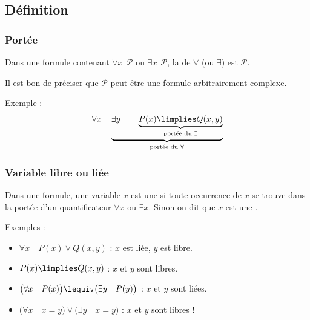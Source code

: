 \documentclass[11pt,class=report,crop=false]{standalone}
\begin{document}
\subsection{Définition}

\subsubsection{Portée}

\begin{definition}
Dans une formule contenant \og{}$\forall x \ \ \mathcal{P}$\fg{} ou \og{}$\exists x \ \ \mathcal{P}$\fg{}, la  de $\forall$ (ou $\exists$) est $\mathcal{P}$.
\end{definition}

Il est bon de préciser que $\mathcal{P}$ peut être une formule arbitrairement complexe.

Exemple :
\[
\forall x \quad \underbrace{\exists y \qquad \underbrace{P(x) \limplies Q(x,y)}_{\text{portée du $\exists$}}}_{\text{portée du $\forall$}}
\]


\subsubsection{Variable libre ou liée}

\begin{definition}
Dans une formule, une variable $x$ est une 	 si toute occurrence de $x$ se trouve dans la portée d'un quantificateur $\forall x$ ou $\exists x$.
Sinon on dit que $x$ est une .
\end{definition}

Exemples :
\begin{itemize}
	\item $\forall x \quad P(x) \lor Q(x,y)$ : $x$ est liée, $y$ est libre.
	
	\item $P(x) \limplies Q(x,y)$ : $x$ et $y$ sont libres.
	
	\item $\big(\forall x  \quad P(x)\big) \lequiv \big(\exists y \quad P(y)\big)$ : $x$ et $y$ sont liées.
	
	\item $\big(\forall x  \quad x=y\big) \lor \big(\exists y \quad x=y\big)$ : $x$ et $y$ sont libres !
\end{itemize}
\end{document}
